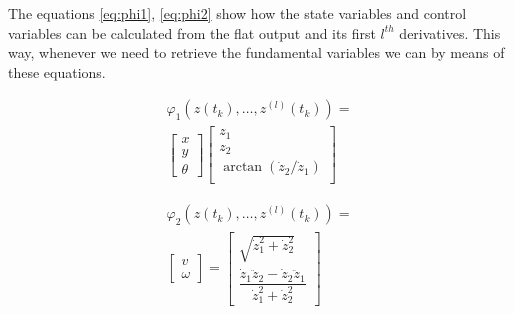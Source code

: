 The equations \ref{eq:phi1}, \ref{eq:phi2} show how the state variables and control variables can be calculated from the flat output and its first $l^{th}$ derivatives. This way, whenever we need to retrieve the fundamental variables we can by means of these equations.

\begin{equation}\label{eq:phi1}
            \begin{array}{l}
            \varphi_1(z(t_k),\dotsc,z^{(l)}(t_k))=\\
            \left[\begin{array}{c}
            x\\
            y\\
            \theta
            \end{array}\right]
            \left[\begin{array}{c}
            z_1\\
            z_2\\
            \arctan(\dot{z}_2/\dot{z}_1)\\
            \end{array}\right]
            \end{array}
\end{equation}

\begin{equation}\label{eq:phi2}
\begin{array}{l}
            \varphi_2(z(t_k),\dotsc,z^{(l)}(t_k))=\\
            \left[\begin{array}{c}
            v\\
            \omega
            \end{array}\right]
            = \left[\begin{array}{c}
            \sqrt{\dot{z}_{1}^{2} + \dot{z}_{2}^{2}}\\
            \dfrac{\dot{z}_{1}\ddot{z}_{2} -
            \dot{z}_{2}\ddot{z}_{1}}{\dot{z}_{1}^{2}+\dot{z}_{2}^{2}}
            \end{array}\right]
            \end{array}
\end{equation}


